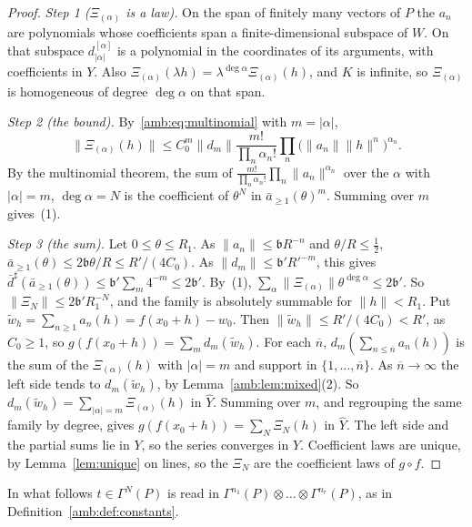 \documentclass[11pt]{amsart}
\theoremstyle{definition}
\theoremstyle{remark}
\numberwithin{equation}{section}
\newcommand{\abs}[1]{\lvert #1\rvert}
\newcommand{\norm}[1]{\lVert #1\rVert}
\theoremstyle{plain}
\theoremstyle{definition}
\theoremstyle{plain}
\begin{document}
\begin{proof}
\emph{Step 1 ($\Xi_{(\alpha)}$ is a law).} On the span of finitely many vectors of $P$ the $a_n$ are polynomials whose coefficients span a finite-dimensional subspace of $W$. On that subspace $d_{\abs\alpha}^{[\alpha]}$ is a polynomial in the coordinates of its arguments, with coefficients in $Y$. Also $\Xi_{(\alpha)}(\lambda h)=\lambda^{\deg\alpha}\Xi_{(\alpha)}(h)$, and $K$ is infinite, so $\Xi_{(\alpha)}$ is homogeneous of degree $\deg\alpha$ on that span.

\emph{Step 2 (the bound).} By~\eqref{amb:eq:multinomial} with $m=\abs\alpha$,
\[
 \norm{\Xi_{(\alpha)}(h)}\le C_0^m\norm{d_m}\frac{m!}{\prod_n\alpha_n!}\prod_n\bigl(\norm{a_n}\norm h^n\bigr)^{\alpha_n}.
\]
By the multinomial theorem, the sum of $\frac{m!}{\prod_n\alpha_n!}\prod_n\norm{a_n}^{\alpha_n}$ over the $\alpha$ with $\abs\alpha=m$, $\deg\alpha=N$ is the coefficient of $\theta^N$ in $\bar a_{\ge1}(\theta)^m$. Summing over $m$ gives~(1).

\emph{Step 3 (the sum).} Let $0\le\theta\le R_1$. As $\norm{a_n}\le \mathfrak bR^{-n}$ and $\theta/R\le\frac12$, $\bar a_{\ge1}(\theta)\le2\mathfrak b\theta/R\le R'/(4C_0)$. As $\norm{d_m}\le \mathfrak b'R'^{-m}$, this gives $\bar d^\sharp(\bar a_{\ge1}(\theta))\le \mathfrak b'\sum_m4^{-m}\le2\mathfrak b'$. By~(1), $\sum_\alpha\norm{\Xi_{(\alpha)}}\theta^{\deg\alpha}\le2\mathfrak b'$. So $\norm{\Xi_N}\le2\mathfrak b'R_1^{-N}$, and the family is absolutely summable for $\norm h<R_1$. Put $\tilde w_h=\sum_{n\ge1}a_n(h)=f(x_0+h)-w_0$. Then $\norm{\tilde w_h}\le R'/(4C_0)<R'$, as $C_0\ge1$, so $g(f(x_0+h))=\sum_md_m(\tilde w_h)$. For each $\overline n$, $d_m(\sum_{n\le\overline n}a_n(h))$ is the sum of the $\Xi_{(\alpha)}(h)$ with $\abs\alpha=m$ and support in $\{1,\dots,\overline n\}$. As $\overline n\to\infty$ the left side tends to $d_m(\tilde w_h)$, by Lemma~\ref{amb:lem:mixed}(2). So $d_m(\tilde w_h)=\sum_{\abs\alpha=m}\Xi_{(\alpha)}(h)$ in $\widehat Y$. Summing over $m$, and regrouping the same family by degree, gives $g(f(x_0+h))=\sum_N\Xi_N(h)$ in $\widehat Y$. The left side and the partial sums lie in $Y$, so the series converges in $Y$. Coefficient laws are unique, by Lemma~\ref{lem:unique} on lines, so the $\Xi_N$ are the coefficient laws of $g\circ f$.
\end{proof}

In what follows $t\in\Gamma^N(P)$ is read in $\Gamma^{n_1}(P)\otimes\dots\otimes\Gamma^{n_r}(P)$, as in Definition~\ref{amb:def:constants}.
\end{document}
